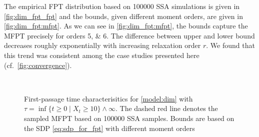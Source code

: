 The empirical \ac{FPT} distribution based on \num{100000} \ac{SSA} simulations is given in \autoref{fig:dim_fpt_fpt}
and the bounds, given different moment orders, are given in \autoref{fig:dim_fpt:mfpt}.
As we can see in \autoref{fig:dim_fpt:mfpt}, the bounds capture the \ac{MFPT} precisely for orders \numlist{5;6}.
The difference between upper and lower bound decreases roughly exponentially with increasing relaxation order $r$.
We found that this trend was consistent among the case studies presented here (cf.\ \autoref{fig:convergence}).
\begin{figure}
	\centering
	 \\
	\caption[\ac{FPT} and \ac{MFPT} distribution and bounds]{First-passage time characterisitics for \autoref{model:dim} with $\tau=\inf\{t\geq 0\mid X_t \geq 10\}\land \infty$.
	The dashed red line denotes the sampled \ac{MFPT} based on \num{100000} \ac{SSA} samples. Bounds are based on the \ac{SDP} \eqref{eq:sdp_for_fpt} with different moment orders}
\end{figure}

